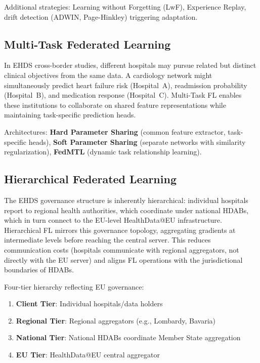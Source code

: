 \documentclass[conference]{IEEEtran}
\begin{document}
Additional strategies: Learning without Forgetting (LwF), Experience Replay, drift detection (ADWIN, Page-Hinkley) triggering adaptation.

\subsection{Multi-Task Federated Learning}

In EHDS cross-border studies, different hospitals may pursue related but distinct clinical objectives from the same data. A cardiology network might simultaneously predict heart failure risk (Hospital~A), readmission probability (Hospital~B), and medication response (Hospital~C). Multi-Task FL enables these institutions to collaborate on shared feature representations while maintaining task-specific prediction heads.

Architectures: \textbf{Hard Parameter Sharing} (common feature extractor, task-specific heads), \textbf{Soft Parameter Sharing} (separate networks with similarity regularization), \textbf{FedMTL} (dynamic task relationship learning).

\subsection{Hierarchical Federated Learning}

The EHDS governance structure is inherently hierarchical: individual hospitals report to regional health authorities, which coordinate under national HDABs, which in turn connect to the EU-level HealthData@EU infrastructure. Hierarchical FL mirrors this governance topology, aggregating gradients at intermediate levels before reaching the central server. This reduces communication costs (hospitals communicate with regional aggregators, not directly with the EU server) and aligns FL operations with the jurisdictional boundaries of HDABs.

Four-tier hierarchy reflecting EU governance:
\begin{enumerate}
    \item \textbf{Client Tier}: Individual hospitals/data holders
    \item \textbf{Regional Tier}: Regional aggregators (e.g., Lombardy, Bavaria)
    \item \textbf{National Tier}: National HDABs coordinate Member State aggregation
    \item \textbf{EU Tier}: HealthData@EU central aggregator
\end{enumerate}
\end{document}
